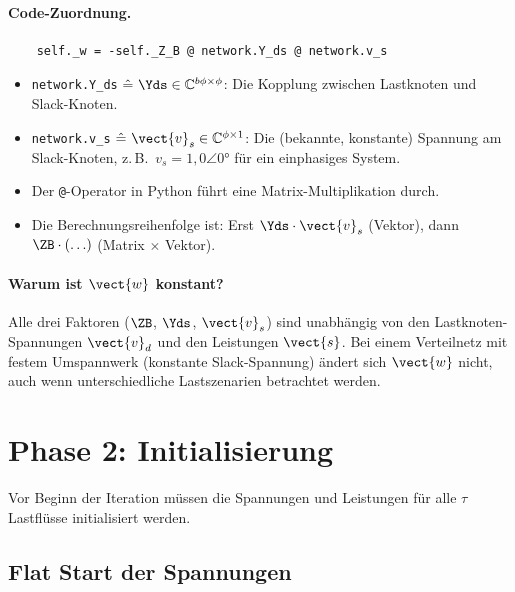 \paragraph{Code-Zuordnung.}
\begin{verbatim}
	self._w = -self._Z_B @ network.Y_ds @ network.v_s
\end{verbatim}

\begin{itemize}
	\item \texttt{network.Y\_ds} $\hat{=}\ \Yds \in \mathbb{C}^{b\phi \times \phi}$: Die Kopplung zwischen Lastknoten und Slack-Knoten.
	\item \texttt{network.v\_s} $\hat{=}\ \vect{v}_s \in \mathbb{C}^{\phi \times 1}$: Die (bekannte, konstante) Spannung am Slack-Knoten, z.\,B.\ $v_s = 1{,}0 \angle 0°$ für ein einphasiges System.
	\item Der \texttt{@}-Operator in Python führt eine Matrix-Multiplikation durch.
	\item Die Berechnungsreihenfolge ist: Erst $\Yds \cdot \vect{v}_s$ (Vektor), dann $\ZB \cdot (\ldots)$ (Matrix $\times$ Vektor).
\end{itemize}

\paragraph{Warum ist $\vect{w}$ konstant?} Alle drei Faktoren ($\ZB$, $\Yds$, $\vect{v}_s$) sind unabhängig von den Lastknoten-Spannungen $\vect{v}_d$ und den Leistungen $\vect{s}$. Bei einem Verteilnetz mit festem Umspannwerk (konstante Slack-Spannung) ändert sich $\vect{w}$ nicht, auch wenn unterschiedliche Lastszenarien betrachtet werden.

\section{Phase 2: Initialisierung}
\label{sec:initialisierung}

Vor Beginn der Iteration müssen die Spannungen und Leistungen für alle $\tau$ Lastflüsse initialisiert werden.

\subsection{Flat Start der Spannungen}
\label{subsec:flat_start}

